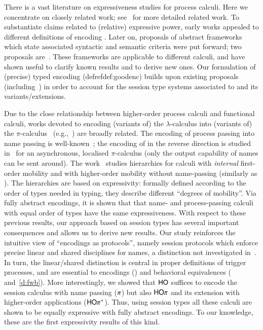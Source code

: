 There is a vast literature on expressiveness studies for process calculi. 
Here we concentrate on closely related work; 
see~\cite{KouzapasPY15} for more detailed related work. 
To substantiate claims related to (relative) expressive power,
early works appealed to different definitions of encoding \cite{Palamidessi03}.
Later on, 
proposals of abstract 
frameworks which 
state associated syntactic and semantic criteria 
were put forward; 
two proposals are~\cite{DBLP:journals/iandc/Gorla10,DBLP:journals/tcs/FuL10}. 
These frameworks are applicable to different calculi, and 
have shown useful to clarify known results and to derive new ones.
Our formulation of (precise) typed encoding (defref{def:goodenc}) 
builds upon existing proposals (including~\cite{Palamidessi03,DBLP:journals/iandc/Gorla10,DBLP:conf/icalp/LanesePSS10})
in order to account for the session type systems
associated to \HOp and its variants/extensions.

Due to the close relationship between
higher-order process calculi and functional calculi, works devoted to
encoding (variants of) the $\lambda$-calculus into (variants of) the
$\pi$-calculus~ (e.g.,~\cite{San92,DBLP:journals/tcs/Fu99}) are broadly related.
The encoding of process passing into name passing is well-known~\cite{SangiorgiD:expmpa};
the encoding of in the reverse direction 
is studied in~\cite{SaWabook} for an asynchronous, localised $\pi$-calculus
(only the output capability of names can be sent around).  The
work~\cite{San96int} studies hierarchies for calculi with
\emph{internal} first-order mobility and with higher-order mobility
without name-passing (similarly as \HO). The
hierarchies are based on expressivity: formally defined according to
the order of types needed in typing, they describe different ``degrees
of mobility''.  Via fully abstract encodings, it is shown that that
name- and process-passing calculi with equal order of types have the
same expressiveness.  With respect to these previous results, our
approach based on session types has several important consequences and
allows us to derive new results.  Our study reinforces the intuitive
view of ``encodings as protocols'', namely session protocols which
enforce precise linear and shared disciplines for names, a distinction
not investigated in~\cite{SangiorgiD:expmpa,DBLP:journals/tcs/Sangiorgi01}. In
turn, the linear/shared distinction is central in proper definitions
of trigger processes, and are essential to encodings
() and behavioral equivalences
( and~\ref{d:fwb}).  More interestingly, we showed that
$\mathsf{HO}$ suffices to encode  the session
calculus with name passing ($\pi$) but also $\mathsf{HO}\pi$ and its extension with
higher-order applications ($\mathsf{HO\pi^{+}}$). Thus, using session types
all these calculi are shown to be equally expressive with fully
abstract encodings.  To our knowledge, these are the first
expressivity results of this kind.


